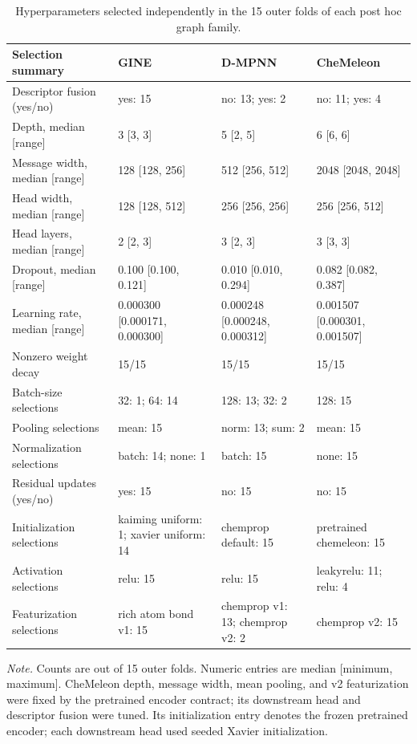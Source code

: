 \begin{table}[H]
\centering
\caption{Hyperparameters selected independently in the 15 outer folds of each post hoc graph family.}
\label{tab:tuned-gnn-selections}
\scriptsize
\setlength{\tabcolsep}{3pt}
\begin{tabular}{L{0.25\textwidth}L{0.22\textwidth}L{0.22\textwidth}L{0.22\textwidth}}
\toprule
\textbf{Selection summary} & \textbf{GINE} & \textbf{D-MPNN} & \textbf{CheMeleon} \\ 
\midrule
Descriptor fusion (yes/no) & yes: 15 & no: 13; yes: 2 & no: 11; yes: 4 \\
Depth, median [range] & 3 [3, 3] & 5 [2, 5] & 6 [6, 6] \\
Message width, median [range] & 128 [128, 256] & 512 [256, 512] & 2048 [2048, 2048] \\
Head width, median [range] & 128 [128, 512] & 256 [256, 256] & 256 [256, 512] \\
Head layers, median [range] & 2 [2, 3] & 3 [2, 3] & 3 [3, 3] \\
Dropout, median [range] & 0.100 [0.100, 0.121] & 0.010 [0.010, 0.294] & 0.082 [0.082, 0.387] \\
Learning rate, median [range] & 0.000300 [0.000171, 0.000300] & 0.000248 [0.000248, 0.000312] & 0.001507 [0.000301, 0.001507] \\
Nonzero weight decay & 15/15 & 15/15 & 15/15 \\
Batch-size selections & 32: 1; 64: 14 & 128: 13; 32: 2 & 128: 15 \\
Pooling selections & mean: 15 & norm: 13; sum: 2 & mean: 15 \\
Normalization selections & batch: 14; none: 1 & batch: 15 & none: 15 \\
Residual updates (yes/no) & yes: 15 & no: 15 & no: 15 \\
Initialization selections & kaiming uniform: 1; xavier uniform: 14 & chemprop default: 15 & pretrained chemeleon: 15 \\
Activation selections & relu: 15 & relu: 15 & leakyrelu: 11; relu: 4 \\
Featurization selections & rich atom bond v1: 15 & chemprop v1: 13; chemprop v2: 2 & chemprop v2: 15 \\
\bottomrule
\end{tabular}
\par\vspace{3pt}\parbox{0.95\textwidth}{\footnotesize \textit{Note.} Counts are out of 15 outer folds. Numeric entries are median [minimum, maximum]. CheMeleon depth, message width, mean pooling, and v2 featurization were fixed by the pretrained encoder contract; its downstream head and descriptor fusion were tuned. Its initialization entry denotes the frozen pretrained encoder; each downstream head used seeded Xavier initialization.}
\end{table}
